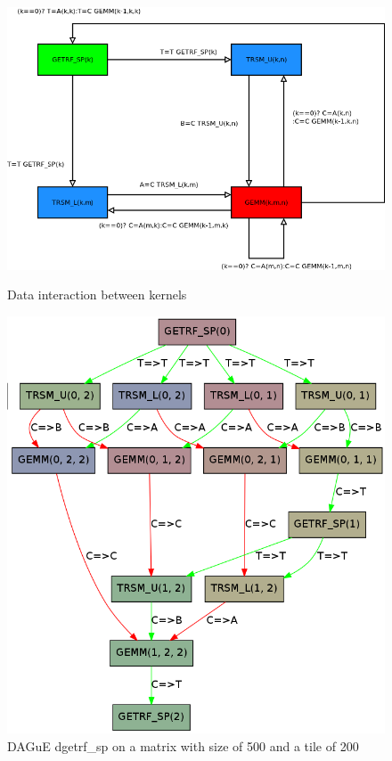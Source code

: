 \documentclass{report}
\begin{document}
\begin{figure}[!h]
\begin{minipage}[!h]{.5\linewidth}
\centering
\includegraphics[width=\textwidth]{dag_getrf_sp.png}
\caption{Data interaction between kernels}
\end{minipage} \hfill
\begin{minipage}[!h]{.5\linewidth}
\includegraphics[width=\textwidth]{dag.png}
\caption{DAGuE dgetrf\_sp on a matrix with size of 500 and a tile of 200}
\end{minipage}
\end{figure}
\end{document}
